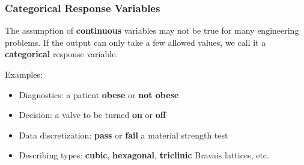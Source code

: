 \documentclass[10pt,aspectratio=169]{beamer}
\begin{document}
\begin{frame}
  \frametitle{Categorical Response Variables}

  The assumption of \textbf{continuous} variables may not be true for many engineering problems.
  If the output can only take a few allowed values, we call it a \textbf{categorical} response variable.

  \vfill
  Examples:

  \begin{itemize}
    \vfill \item Diagnostics: 	a patient \textbf{obese} or \textbf{not obese}
\vfill \item Decision:      	a valve to be turned \textbf{on} or \textbf{off}
\vfill \item Data discretization:  \textbf{pass} or \textbf{fail} a material strength test
\vfill \item Describing types: \textbf{cubic}, \textbf{hexagonal},
  \textbf{triclinic} Bravais lattices, etc.

\end{itemize}

\vspace{2em}

\end{frame}


\end{document}
